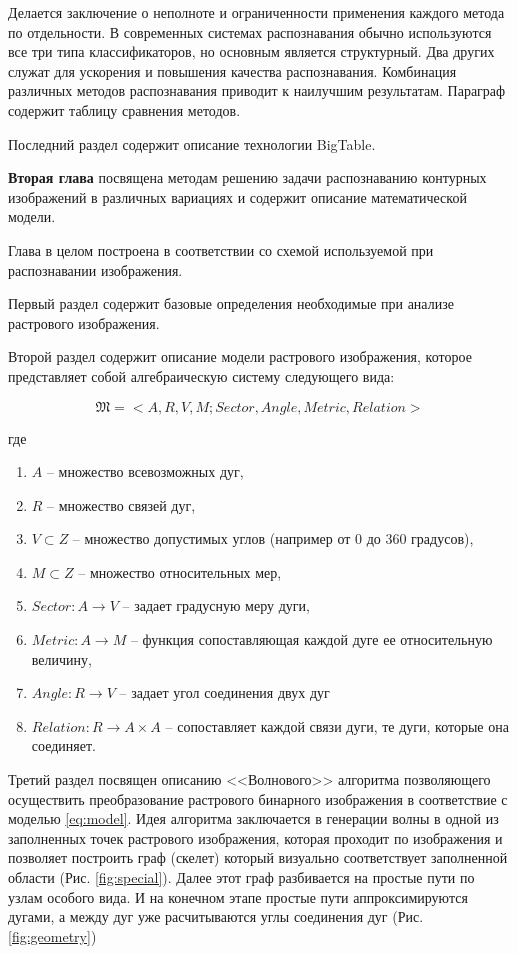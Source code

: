 \noindent
Делается заключение о неполноте и ограниченности применения каждого метода по отдельности. В современных системах распознавания обычно используются все три типа классификаторов, но основным является структурный. Два других служат для ускорения и повышения качества распознавания. Комбинация различных методов распознавания приводит к наилучшим результатам. Параграф содержит таблицу сравнения методов.

Последний раздел содержит описание технологии BigTable.

\textbf{Вторая глава} посвящена методам решению  задачи распознаванию контурных изображений в различных вариациях и содержит описание математической модели.

Глава в целом построена в соответствии со схемой используемой при распознавании изображения.
 
Первый раздел содержит базовые определения необходимые при анализе растрового изображения.
 
Второй раздел содержит описание модели растрового изображения, которое представляет собой алгебраическую систему следующего вида:

\begin{equation}
\mathfrak{M} = < A, R, V, M; Sector, Angle, Metric, Relation >
\label{eq:model}
\end{equation}

\noindent
где
\begin{enumerate}
\item[] $A$ -- множество всевозможных дуг,
\item[] $R$ -- множество связей дуг,
\item[] $V \subset Z$ -- множество допустимых углов (например от 0 до 360 градусов),
\item[] $M \subset Z$ -- множество относительных мер,
\item[] $Sector: A \rightarrow V$ -- задает градусную меру дуги,
\item[] $Metric: A \rightarrow M$ -- функция сопоставляющая каждой дуге ее относительную величину,
\item[] $Angle: R \rightarrow V$ -- задает угол соединения двух дуг
\item[] $Relation: R \rightarrow A \times A$ -- сопоставляет каждой связи дуги, те дуги, которые она соединяет.
\end{enumerate}

Третий раздел посвящен описанию <<Волнового>> алгоритма позволяющего осуществить преобразование растрового бинарного изображения в соответствие с моделью \ref{eq:model}. Идея алгоритма заключается в генерации волны в одной из заполненных точек растрового изображения, которая проходит по изображения и позволяет построить граф (скелет) который визуально соответствует заполненной области (Рис. \ref{fig:special}). Далее этот граф разбивается на простые пути по узлам особого вида. И на конечном этапе простые пути аппроксимируются дугами, а между дуг уже расчитываются углы соединения дуг (Рис. \ref{fig:geometry})

